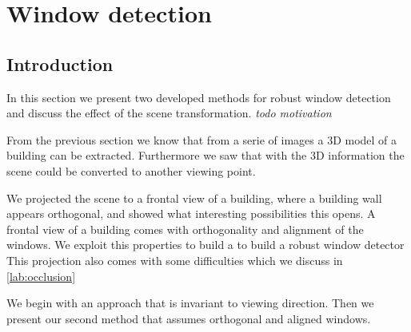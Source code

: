 





%
%




\section{Window detection}


\label{chap:windowDetection}
\subsection{Introduction}

In this section we present two developed methods for robust window detection and
discuss the effect of the scene transformation.
\emph{ todo motivation}

From the previous section we know that from a serie of images a 3D model of a
building can be extracted. Furthermore we saw that with the 3D information the
scene could be converted to another viewing point. 

We projected the scene to a frontal view of a building, where a building wall appears
orthogonal, and showed what interesting possibilities this opens.
A frontal view of a building comes with orthogonality and alignment of the
windows. We exploit this properties to build a to build a robust window detector
This projection also comes with some difficulties which we discuss in \ref{lab:occlusion}


We begin with an approach that is invariant to viewing direction.  Then we
present our second method that assumes orthogonal and aligned windows.


